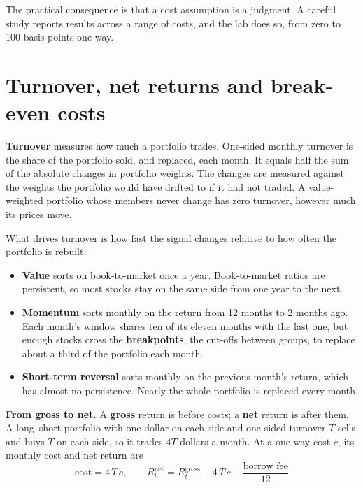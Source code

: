 The practical consequence is that a cost assumption is a judgment. A careful study reports results across a range of costs, and the lab does so, from zero to 100 basis points one way.

\section{Turnover, net returns and break-even costs}
\label{sec:17-turnover}

\textbf{Turnover} measures how much a portfolio trades. One-sided monthly turnover is the share of the portfolio sold, and replaced, each month. It equals half the sum of the absolute changes in portfolio weights. The changes are measured against the weights the portfolio would have drifted to if it had not traded. A value-weighted portfolio whose members never change has zero turnover, however much its prices move.

What drives turnover is how fast the signal changes relative to how often the portfolio is rebuilt:

\begin{itemize}
  \item \textbf{Value} sorts on book-to-market once a year. Book-to-market ratios are persistent, so most stocks stay on the same side from one year to the next.
  \item \textbf{Momentum} sorts monthly on the return from 12 months to 2 months ago. Each month's window shares ten of its eleven months with the last one, but enough stocks cross the \textbf{breakpoints}, the cut-offs between groups, to replace about a third of the portfolio each month.
  \item \textbf{Short-term reversal} sorts monthly on the previous month's return, which has almost no persistence. Nearly the whole portfolio is replaced every month.
\end{itemize}

\textbf{From gross to net.} A \textbf{gross} return is before costs; a \textbf{net} return is after them. A long--short portfolio with one dollar on each side and one-sided turnover $T$ sells and buys $T$ on each side, so it trades $4T$ dollars a month. At a one-way cost $c$, its monthly cost and net return are
\begin{equation}
  \text{cost} = 4\,T\,c, \qquad R^{\text{net}}_t = R^{\text{gross}}_t - 4\,T\,c - \frac{\text{borrow fee}}{12}
  \label{eq:17-net}
\end{equation}

